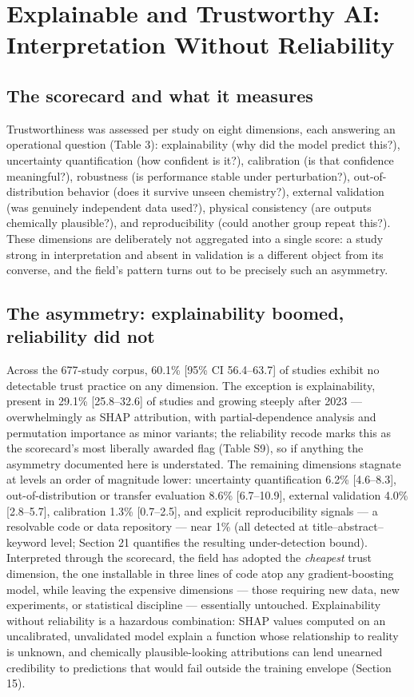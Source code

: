 \documentclass[pdflatex,sn-basic]{sn-jnl}
\begin{document}
\section{Explainable and Trustworthy AI: Interpretation Without Reliability}

\subsection{The scorecard and what it measures}

Trustworthiness was assessed per study on eight dimensions, each answering an operational question (Table 3): explainability (why did the model predict this?), uncertainty quantification (how confident is it?), calibration (is that confidence meaningful?), robustness (is performance stable under perturbation?), out-of-distribution behavior (does it survive unseen chemistry?), external validation (was genuinely independent data used?), physical consistency (are outputs chemically plausible?), and reproducibility (could another group repeat this?). These dimensions are deliberately not aggregated into a single score: a study strong in interpretation and absent in validation is a different object from its converse, and the field's pattern turns out to be precisely such an asymmetry.

\subsection{The asymmetry: explainability boomed, reliability did not}

Across the 677-study corpus, 60.1\% [95\% CI 56.4--63.7] of studies exhibit no detectable trust practice on any dimension. The exception is explainability, present in 29.1\% [25.8--32.6] of studies and growing steeply after 2023 --- overwhelmingly as SHAP attribution, with partial-dependence analysis and permutation importance as minor variants; the reliability recode marks this as the scorecard's most liberally awarded flag (Table S9), so if anything the asymmetry documented here is understated. The remaining dimensions stagnate at levels an order of magnitude lower: uncertainty quantification 6.2\% [4.6--8.3], out-of-distribution or transfer evaluation 8.6\% [6.7--10.9], external validation 4.0\% [2.8--5.7], calibration 1.3\% [0.7--2.5], and explicit reproducibility signals --- a resolvable code or data repository --- near 1\% (all detected at title--abstract--keyword level; Section 21 quantifies the resulting under-detection bound). Interpreted through the scorecard, the field has adopted the \emph{cheapest} trust dimension, the one installable in three lines of code atop any gradient-boosting model, while leaving the expensive dimensions --- those requiring new data, new experiments, or statistical discipline --- essentially untouched. Explainability without reliability is a hazardous combination: SHAP values computed on an uncalibrated, unvalidated model explain a function whose relationship to reality is unknown, and chemically plausible-looking attributions can lend unearned credibility to predictions that would fail outside the training envelope (Section 15).
\end{document}
